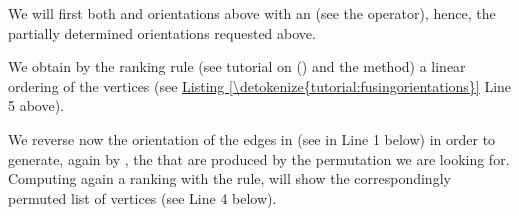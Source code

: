 \documentclass[a4paper,12pt,english]{sphinxhowto}
\begin{document}
We will first  both  and  orientations above with an  (see the  operator), hence, the partially determined orientations requested above.
\def\sphinxLiteralBlockLabel{\label{\detokenize{tutorial:fusingorientations}}}
\begin{sphinxVerbatim}[commandchars=\\\{\},numbers=left,firstnumber=1,stepnumber=1]
   
  
  
\end{sphinxVerbatim}

We obtain by the  ranking rule (see tutorial on {\hyperref[\detokenize{tutorial:ranking-tutorial-label}]{}} () and the  method) a linear ordering of the vertices (see \hyperref[\detokenize{tutorial:fusingorientations}]{Listing \ref{\detokenize{tutorial:fusingorientations}}} Line 5 above).

We reverse now the orientation of the edges in  (see  in Line 1 below) in order to generate, again by , the  that are produced by the permutation we are looking for. Computing again a ranking with the  rule, will show the correspondingly permuted list of vertices (see Line 4 below).
\end{document}
